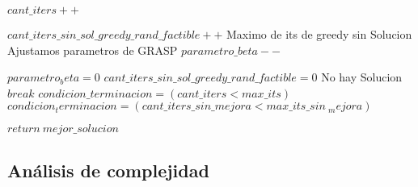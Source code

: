 \begin{algorithmic}[1]
	        	    	
	        	\EndIf
	
	        	\State $cant\_iters++$
	    	
	    	    	\Else
	    	    	\State $cant\_iters\_sin\_sol\_greedy\_rand\_factible++$
	    	    		\Comment Maximo de its de greedy sin Solucion
	    	    	            	\Comment Ajustamos parametros de GRASP
	    	    	                \State $parametro\_beta--$
	    	    	            \EndIf
	
	        	    	\State $parametro_beta = 0$
	        		\EndIf
	        		\State $cant\_iters\_sin\_sol\_greedy\_rand\_factible = 0$
	        	\EndIf
        	\EndIf
        \Else
        \Comment No hay Solucion
        	\State $break$
        \EndIf	
           \State $condicion\_terminacion = (cant\_iters < max\_its)$            
            \State $condicion_terminacion = (cant\_iters\_sin\_mejora < max\_its\_sin\ _mejora)$
        \EndIf

       \EndWhile

       \State $return\:  mejor\_solucion$

\EndProcedure
\end{algorithmic}


\subsection{An\'alisis de complejidad}

